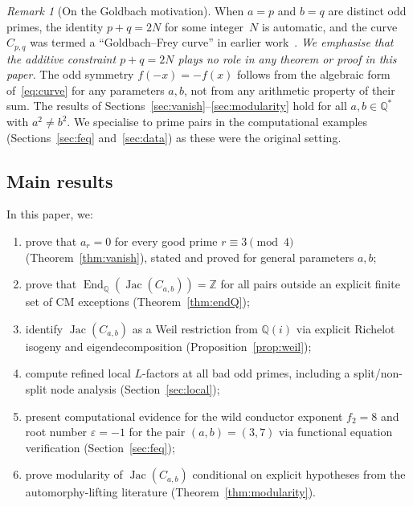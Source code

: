 \documentclass[11pt,a4paper]{article}
\newcommand{\Jac}{\operatorname{Jac}}
\newcommand{\End}{\operatorname{End}}
\theoremstyle{definition}
\theoremstyle{remark}
\newtheorem{remark}[theorem]{Remark}
\begin{document}
\begin{remark}[On the Goldbach motivation]\label{rem:goldbach}
  When $a = p$ and $b = q$ are distinct odd primes, the
  identity $p + q = 2N$ for some integer~$N$ is automatic,
  and the curve $C_{p,q}$ was termed a ``Goldbach--Frey curve''
  in earlier work~\cite{Chen2026TCV,Chen2026UTS}.
  \emph{We emphasise that the additive constraint $p + q = 2N$
  plays no role in any theorem or proof in this paper.}
  The odd symmetry $f(-x) = -f(x)$ follows from the algebraic
  form of~\eqref{eq:curve} for any parameters $a, b$, not from
  any arithmetic property of their sum.
  The results of
  Sections~\ref{sec:vanish}--\ref{sec:modularity}
  hold for all $a, b \in \mathbb{Q}^*$ with $a^2 \ne b^2$.
  We specialise to prime pairs in the computational examples
  (Sections~\ref{sec:feq} and~\ref{sec:data}) as these were the
  original setting.
\end{remark}

\subsection{Main results}
In this paper, we:
\begin{enumerate}[label=(\roman*)]
\item prove that $a_r = 0$ for every good prime
  $r \equiv 3 \pmod{4}$ (Theorem~\ref{thm:vanish}),
  stated and proved for general parameters $a, b$;
\item prove that $\End_{\mathbb{Q}}(\Jac(C_{a,b})) = \mathbb{Z}$
  for all pairs outside an explicit finite set of CM exceptions
  (Theorem~\ref{thm:endQ});
\item identify $\Jac(C_{a,b})$ as a Weil restriction from
  $\mathbb{Q}(i)$ via explicit Richelot isogeny and
  eigendecomposition (Proposition~\ref{prop:weil});
\item compute refined local $L$-factors at all bad odd primes,
  including a split/non-split node analysis
  (Section~\ref{sec:local});
\item present computational evidence for the wild conductor
  exponent $f_2 = 8$ and root number $\varepsilon = -1$ for the
  pair $(a,b) = (3,7)$ via functional equation verification
  (Section~\ref{sec:feq});
\item prove modularity of $\Jac(C_{a,b})$ conditional on
  explicit hypotheses from the automorphy-lifting literature
  (Theorem~\ref{thm:modularity}).
\end{enumerate}


\end{document}
